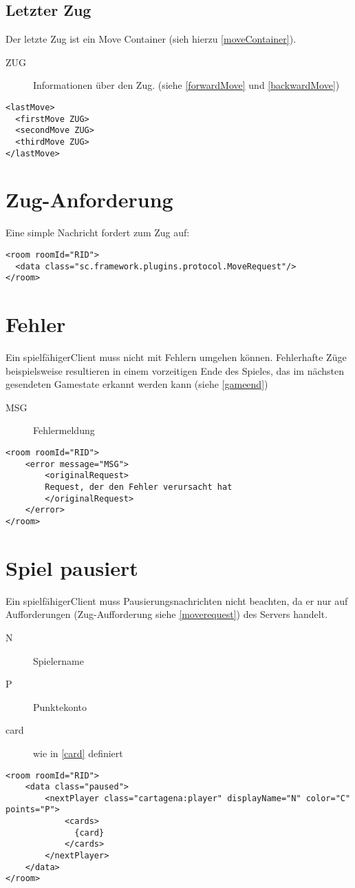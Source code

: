 \documentclass[12pt,a4paper, ngerman, oneside]{scrartcl}
\begin{document}
\subsection{\label{lastmove}Letzter Zug}
Der letzte Zug ist ein Move Container (sieh hierzu \ref{moveContainer}).
\begin{description}
\item[ZUG] Informationen über den Zug. (siehe \ref{forwardMove} und
\ref{backwardMove})
\end{description}
\begin{verbatim}
<lastMove>
  <firstMove ZUG>
  <secondMove ZUG>
  <thirdMove ZUG>
</lastMove>
\end{verbatim}

\section{\label{moverequest}Zug-Anforderung}
Eine simple Nachricht fordert zum Zug auf:
\begin{verbatim}
<room roomId="RID">
  <data class="sc.framework.plugins.protocol.MoveRequest"/>
</room>
\end{verbatim}

\section{Fehler}
Ein \glqq spielfähiger\grqq Client muss nicht mit Fehlern umgehen können. Fehlerhafte Züge beispielsweise resultieren in einem vorzeitigen Ende des Spieles, das im nächsten gesendeten Gamestate erkannt werden kann (siehe \ref{gameend})
\begin{description}
\item[MSG] Fehlermeldung
\end{description}
\begin{verbatim}
<room roomId="RID">
	<error message="MSG">
		<originalRequest>
		Request, der den Fehler verursacht hat
		</originalRequest>
	</error>
</room>
\end{verbatim}

\section{Spiel pausiert}
Ein \glqq spielfähiger\grqq Client muss Pausierungsnachrichten nicht beachten, da er nur auf Aufforderungen (Zug-Aufforderung siehe \ref{moverequest}) des Servers handelt.
\begin{description}
\item[N] Spielername
\item[P] Punktekonto
\item[card] wie in \ref{card} definiert
\end{description}
\begin{verbatim}
<room roomId="RID">
	<data class="paused">
		<nextPlayer class="cartagena:player" displayName="N" color="C" points="P">
			<cards>
			  {card}
			</cards>
		</nextPlayer>
	</data>
</room>
\end{verbatim}
\end{document}
